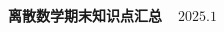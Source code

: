 \documentclass[10pt,landscape,a4paper]{article}
\begin{document}

\scriptsize
\begin{multicols*}{6}
\centerline{\textbf{离散数学期末知识点汇总~~$2025.1$}}
\fontsize{6pt}{7pt}

\newpage

\end{multicols*}
\end{document}
